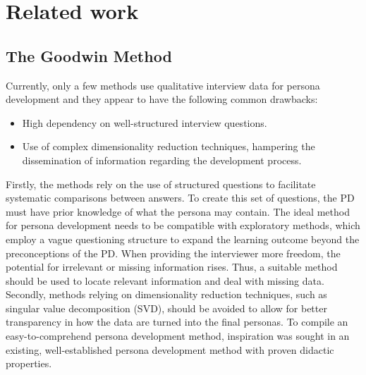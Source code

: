 \section{Related work}

\subsection{The Goodwin Method}

Currently, only a few methods \citep{Laporte2012,Miaskiewicz2008} use qualitative interview data for persona development and they appear to have the following common drawbacks:

\begin{itemize}
  \item High dependency on well-structured interview questions.
  \item Use of complex dimensionality reduction techniques, hampering the dissemination of information regarding the development process.
\end{itemize}

Firstly, the methods rely on the use of structured questions to facilitate systematic comparisons between answers. To create this set of questions, the PD must have prior knowledge of what the persona may contain. The ideal method for persona development needs to be compatible with exploratory methods, which employ a vague questioning structure to expand the learning outcome beyond the preconceptions of the PD. When providing the interviewer more freedom, the potential for irrelevant or missing information rises. Thus, a suitable method should be used to locate relevant information and deal with missing data. Secondly, methods relying on dimensionality reduction techniques, such as singular value decomposition (SVD), should be avoided to allow for better transparency in how the data are turned into the final personas. To compile an easy-to-comprehend persona development method, inspiration was sought in an existing, well-established persona development method with proven didactic properties.


